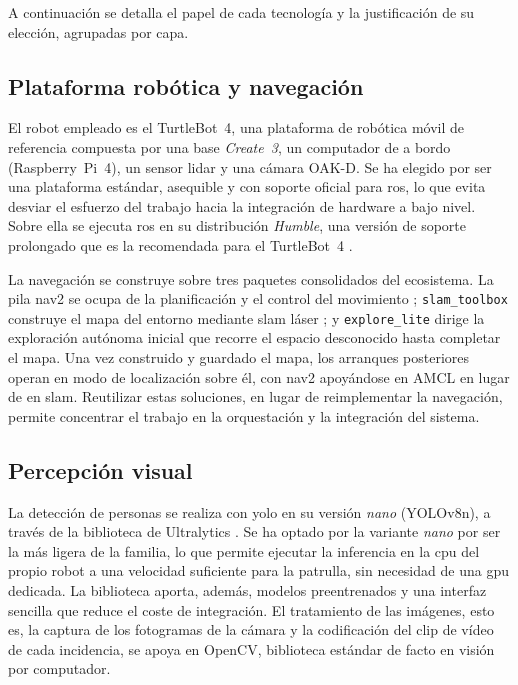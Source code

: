 A continuación se detalla el papel de cada tecnología y la justificación de su
elección, agrupadas por capa.

\subsection{Plataforma robótica y navegación}

El robot empleado es el TurtleBot~4, una plataforma de robótica móvil de
referencia compuesta por una base \textit{Create~3}, un computador de a bordo
(Raspberry~Pi~4), un sensor \gls{lidar} y una cámara OAK-D. Se ha elegido por ser
una plataforma estándar, asequible y con soporte oficial para \gls{ros}, lo que
evita desviar el esfuerzo del trabajo hacia la integración de hardware a bajo
nivel. Sobre ella se ejecuta \gls{ros} en su distribución \textit{Humble}, una
versión de soporte prolongado que es la recomendada para el TurtleBot~4
\parencite{macenski2022ros2}.

La navegación se construye sobre tres paquetes consolidados del ecosistema. La
pila \gls{nav2} se ocupa de la planificación y el control del movimiento
\parencite{macenski2020nav2}; \texttt{slam\_toolbox} construye el mapa del entorno
mediante \gls{slam} láser \parencite{macenski2021slamtoolbox}; y
\texttt{explore\_lite} dirige la exploración autónoma inicial que recorre el
espacio desconocido hasta completar el mapa. Una vez construido y guardado el mapa, los
arranques posteriores operan en modo de localización sobre él, con \gls{nav2} apoyándose
en AMCL en lugar de en \gls{slam}. Reutilizar estas soluciones, en lugar
de reimplementar la navegación, permite concentrar el trabajo en la orquestación y
la integración del sistema.

\subsection{Percepción visual}

La detección de personas se realiza con \gls{yolo} en su versión \textit{nano}
(YOLOv8n), a través de la biblioteca de Ultralytics
\parencite{jocher2023ultralytics}. Se ha optado por la variante \textit{nano} por
ser la más ligera de la familia, lo que permite ejecutar la inferencia en la
\acrshort{cpu} del propio robot a una velocidad suficiente para la patrulla, sin
necesidad de una \acrshort{gpu} dedicada. La biblioteca aporta, además, modelos
preentrenados y una interfaz sencilla que reduce el coste de integración. El
tratamiento de las imágenes, esto es, la captura de los fotogramas de la cámara y
la codificación del clip de vídeo de cada incidencia, se apoya en OpenCV,
biblioteca estándar de facto en visión por computador.

